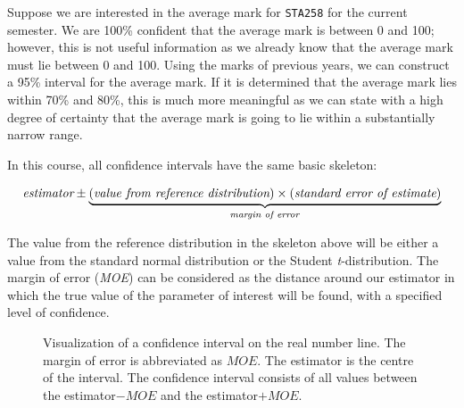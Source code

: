 \vspace{2em}
Suppose we are interested in the average mark for \texttt{STA258} for the current semester. We are 100\% confident that the average mark is between 0 and 100; however, this is not useful information as we already know that the average mark must lie between 0 and 100. Using the marks of previous years, we can construct a 95\% interval for the average mark. If it is determined that the average mark lies within 70\% and 80\%, this is much more meaningful as we can state with a high degree of certainty that the average mark is going to lie within a substantially narrow range.


\noindent
\vspace{0.5em}
In this course, all confidence intervals have the same basic skeleton:

\begin{tcolorbox}[
    colback=yellow!10, 
    colframe=black!80, 
    sharp corners=south, 
    boxrule=0.5pt,
    breakable,
    enhanced
]
\[
\textit{estimator} \pm 
\underbrace{
\left(
\textit{value from reference distribution}
\right)
\times 
\left(
\textit{standard error of estimate}
\right)
}_{\text{\textit{margin of error}}}
\]
\end{tcolorbox}

The value from the reference distribution in the skeleton above will be either a value from the standard normal distribution or the Student \textit{t}-distribution. The margin of error (\textit{MOE}) can be considered as the distance around our estimator in which the true value of the parameter of interest will be found, with a specified level of confidence.

\vspace{1em}

\begin{figure}[H]
\label{figureVisualization of CI}
\begin{center}
\end{center}
\vspace{-0.60cm}
\caption{Visualization of a confidence interval on the real number line. The margin of error is abbreviated as $MOE$. The estimator is the centre of the interval. The confidence interval consists of all values between the estimator$- MOE$ and the estimator$+ MOE$.}
\end{figure}

